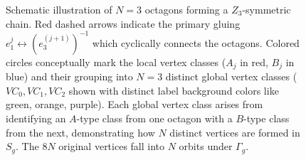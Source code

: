 \documentclass{article}
\begin{document}
\begin{figure}[htbp]

\caption{Schematic illustration of $N=3$ octagons forming a $Z_3$-symmetric chain.
Red dashed arrows indicate the primary gluing $e_1^j \leftrightarrow (e_3^{(j+1)})^{-1}$ which cyclically connects the octagons.
Colored circles conceptually mark the local vertex classes ($A_j$ in red, $B_j$ in blue) and their grouping into $N=3$ distinct global vertex classes ($VC_0, VC_1, VC_2$ shown with distinct label background colors like green, orange, purple).
Each global vertex class arises from identifying an $A$-type class from one octagon with a $B$-type class from the next, demonstrating how $N$ distinct vertices are formed in $S_g$.
The $8N$ original vertices fall into $N$ orbits under $\Gamma_g$.}

\end{figure}
\end{document}

